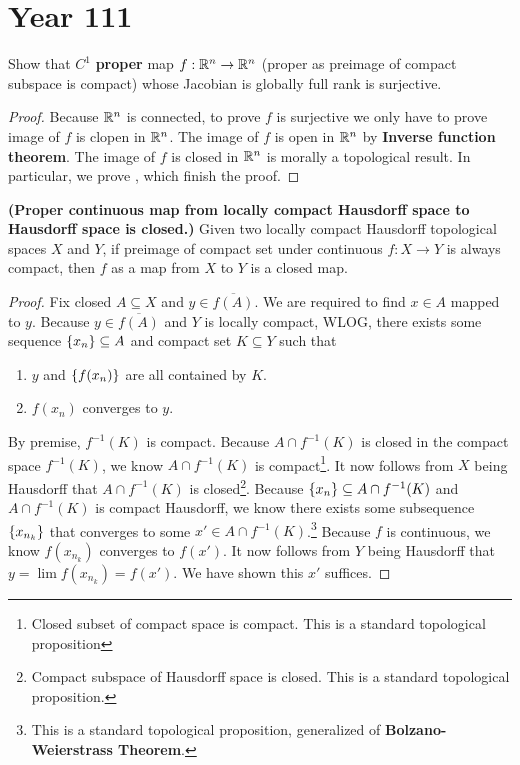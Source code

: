 \documentclass{report}
\begin{document}
\section{Year 111}
\begin{question}{}{}
  Show that $C^1$ \textbf{proper} map  $f:\mathbb{R}^n\rightarrow \mathbb{R}^n$ (proper as preimage of compact subspace is compact) whose Jacobian is globally full rank is surjective. 
\end{question}
\begin{proof}
  Because $\mathbb{R}^n$ is connected,  to prove $f$ is surjective we only have to prove image of $f$ is clopen in  $\mathbb{R}^n$.  The image of $f$ is open in $\mathbb{R}^n$ by  \textbf{Inverse function theorem}. The image of $f$ is closed in  $\mathbb{R}^n$ is morally a topological result. In particular, we prove , which finish the proof.
\end{proof}
\begin{theorem}
\label{Pcmf}
\textbf{(Proper continuous map from locally compact Hausdorff space to Hausdorff space is closed.)} Given two locally compact Hausdorff topological spaces $X$ and $Y$, if preimage of compact set under continuous $f:X\rightarrow Y$ is always compact, then  $f$ as a map from  $X$ to  $Y$ is a closed map.  
\end{theorem}
\begin{proof}
Fix closed $A\subseteq X$ and $y \in \overline{f(A)}$. We are required to find $x \in A$ mapped to $y$. Because $y \in \overline{f(A)}$ and $Y$ is locally compact, WLOG, there exists some sequence $\{ x_n \}\subseteq A$ and compact set $K\subseteq Y$  such that 
\begin{enumerate}[label=(\roman*)]
  \item $y$ and $\{ f(x_n) \}$ are all contained by $K$. 
  \item $f(x_n)$ converges to $y$. 
\end{enumerate}
By premise, $f^{-1}(K)$ is compact. Because $A\cap f^{-1}(K)$ is closed in the  compact space $f^{-1}(K)$, we know $A\cap f^{-1}(K)$ is compact\footnote{Closed subset of compact space is compact. This is a standard topological proposition}. It now follows from $X$ being Hausdorff that  $A \cap f^{-1}(K)$ is closed\footnote{Compact subspace of Hausdorff space is closed. This is a standard topological proposition.}. Because $\{ x_n \}\subseteq A \cap f^{-1}(K)$ and $A\cap f^{-1}(K)$ is compact Hausdorff, we know there exists some  subsequence $\{ x_{n_k} \}$ that converges to some $x'\in A \cap f^{-1}(K)$.\footnote{This is a standard topological proposition, generalized of \textbf{Bolzano-Weierstrass Theorem}.} Because $f$ is continuous, we know  $f(x_{n_k})$ converges to $f(x')$. It now follows from $Y$ being Hausdorff that  $y=\lim f(x_{n_k})=f(x')$. We have shown this $x'$ suffices. 
\end{proof}
\end{document}
